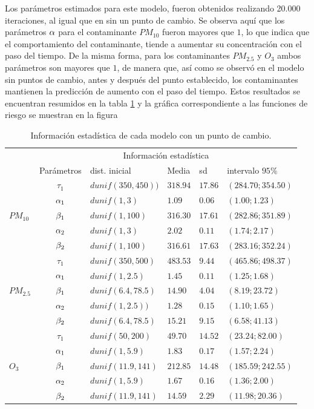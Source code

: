 Los parámetros estimados para este modelo, fueron obtenidos realizando 20.000 iteraciones, al igual que en sin un punto de cambio. Se observa aquí que los parámetros $\alpha$ para el contaminante $PM_{10}$ fueron mayores que $1$, lo que indica que el comportamiento del contaminante, tiende a  aumentar su concentración con el paso del tiempo. De la misma forma, para los contaminantes  $PM_{2.5}$ y $O_3$ ambos parámetros son mayores que $1$, de manera que, así como se observó en el modelo sin puntos de cambio, antes y después del punto establecido, los contaminantes mantienen la predicción de aumento con el paso del tiempo. Estos resultados se encuentran resumidos en la tabla \ref{infoestadupc} y la gráfica correspondiente a las funciones de riesgo se muestran en la figura 
 


\begin{table}[!h]
\centering
\begin{tabular}{|l|c|l|l|l|l|}
\hline
& \multicolumn{5}{c|}{Información estadística} \\
\cline{2-6}
& Parámetros & dist. inicial  & Media & sd  &   intervalo $95 \%$\\
\hline \hline
\multirow{5}{1.5cm}{$PM_{10}$} & $\tau_1$ & $dunif(350,450))$ & $318.94$ & $ 17.86 $ & $(284.70;354.50)$ \\ \cline{2-6}
& $\alpha_1$& $dunif(1, 3)$ & $1.09$ & $0.06$ & $(1.00;1.23)$\\  \cline{2-6}
& $\beta_1$& $dunif(1,100)$ & $316.30$ & $17.61$ & $(282.86;351.89)$\\  \cline{2-6}
& $\alpha_2$& $dunif(1,3)$ & $2.02$ & $0.11$ & $(1.74; 2.17)$\\  \cline{2-6}
& $\beta_2$& $dunif(1,100)$ & $316.61$ & $17.63 $ & $(283.16;352.24)$\\  \cline{1-6}
\multirow{5}{1.5cm}{$PM_{2.5}$} & $\tau_1$ & $dunif(350,500)$& $483.53$ & $9.44$ & $(465.86;498.37)$\\ \cline{2-6}
& $\alpha_1$& $dunif(1,2.5)$ & $1.45$ & $0.11$ & $(1.25;1.68)$\\  \cline{2-6}
& $\beta_1$& $dunif(6.4, 78.5)$ & $14.90$ & $4.04$ & $(8.19;23.72)$\\  \cline{2-6}
& $\alpha_2$& $dunif(1,2.5))$ & $1.28$ & $0.15$ & $(1.10;1.65)$\\  \cline{2-6}
& $\beta_2$& $dunif(6.4, 78.5)$ & $15.21$ & $9.15$ & $(6.58;41.13)$\\  \cline{1-6}
\multirow{5}{1.5cm}{$O_3$} & $\tau_1$ & $dunif(50,200)$ & $49.70$& $14.52$ & $(23.24;82.00)$\\ \cline{2-6}
& $\alpha_1$& $dunif(1, 5.9)$ & $1.83$ & $0.17$ & $(1.57;2.24)$\\  \cline{2-6}
& $\beta_1$& $dunif(11.9, 141)$ & $212.85$ & $14.48$ & $(185.59;242.55)$\\  \cline{2-6}
& $\alpha_2$& $dunif(1, 5.9)$ & $1.67$ & $0.16$ & $(1.36;2.00)$\\  \cline{2-6}
& $\beta_2$& $dunif(11.9, 141)$ & $14.59$ & $2.29$ & $(11.98;20.36)$\\  \cline{1-6}
\end{tabular}
\caption{Información estadística de cada modelo con un  punto de cambio.}
\label{infoestadupc}
\end{table}


